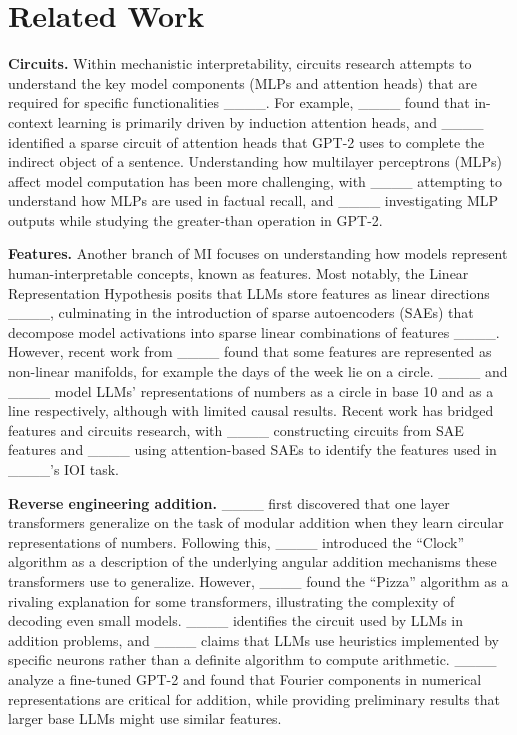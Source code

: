 \section{Related Work}
\textbf{Circuits.} Within mechanistic interpretability, circuits research attempts to understand the key model components (MLPs and attention heads) that are required for specific functionalities ____. For example, ____ found that in-context learning is primarily driven by induction attention heads, and ____ identified a sparse circuit of attention heads that GPT-2 uses to complete the indirect object of a sentence. Understanding how multilayer perceptrons (MLPs) affect model computation has been more challenging, with ____ attempting to understand how MLPs are used in factual recall, and ____ investigating MLP outputs while studying the greater-than operation in GPT-2.


\textbf{Features.} Another branch of MI focuses on understanding how models represent human-interpretable concepts, known as features. Most notably, the Linear Representation Hypothesis posits that LLMs store features as linear directions ____, culminating in the introduction of sparse autoencoders (SAEs) that decompose model activations into sparse linear combinations of features ____. However, recent work from ____ found that some features are represented as non-linear manifolds, for example the days of the week lie on a circle. ____ and ____ model LLMs' representations of numbers as a circle in base 10 and as a line respectively, although with limited causal results. Recent work has bridged features and circuits research, with ____ constructing circuits from SAE features and ____ using attention-based SAEs to identify the features used in ____'s IOI task.




\textbf{Reverse engineering addition.} ____ first discovered that one layer transformers generalize on the task of modular addition when they learn circular representations of numbers. Following this, ____ introduced the ``Clock'' algorithm as a description of the underlying angular addition mechanisms these transformers use to generalize. However, ____ found the ``Pizza'' algorithm as a rivaling explanation for some transformers, illustrating the complexity of decoding even small models.  ____ identifies the circuit used by LLMs in addition problems, and ____ claims that LLMs use heuristics implemented by specific neurons rather than a definite algorithm to compute arithmetic. ____ analyze a fine-tuned GPT-2 and found that Fourier components in numerical representations are critical for addition, while providing preliminary results that larger base LLMs might use similar features.